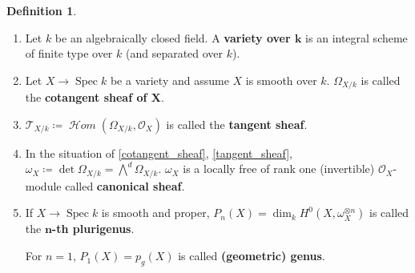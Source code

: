 \documentclass[12pt]{article}
\DeclareMathOperator{\Spec}{Spec}
\DeclareMathOperator{\shHom}{\mathcal{H}\textit{om}}
\theoremstyle{definition}
\newtheorem*{definition}{Definition}
\theoremstyle{remark}
\newtheorem*{comment}{Comment}
\begin{document}
\begin{comment}
There exists another construction of the sheaf of differentials. For that, take the diagonal $\Delta:X\rightarrow X\times_YX$ and a sheaf of ideals $\mathcal{I}_{\Delta}\subseteq\mathcal{O}_{X\times_YX}$. The sheaf of differentials is the $\mathcal{O}_X$-module $\Delta^*(\mathcal{I}/\mathcal{I}^2)$. For further details, see Hartshorne \cite{hartshorne2013algebraic}.

In analysis, if the Jacobian matrix has maximum rank, $d$ variables can be written in terms of the other variables. In algebra, this cannot be done. The solution equations don't need to be polynomials, but, at least on the complex numbers, they are power series (Hensel's lemma). The problem is that most of power series aren't algebraic over the ring of polynomials. But there exists a ring in between that extends polynomials and is algebraic.
\[
\begin{tikzcd}
R=k[x_1,\ldots,x_n]\arrow[rr,hook]\arrow[rd]&&\hat{R}=k[|x_1,\ldots,x_n|]\\
&R^h\arrow[ru]
\end{tikzcd}
\]
$R^h$ is called the ``Henselization'' of $R$.
\end{comment}

\begin{definition}
\begin{enumerate}[label=\arabic*)]
\item Let $k$ be an algebraically closed field. A \textbf{variety over $\boldsymbol{k}$} is an integral scheme of finite type over $k$ (and separated over $k$).

\item\label{cotangent_sheaf} Let $X\rightarrow\Spec k$ be a variety and assume $X$ is smooth over $k$. $\Omega_{X/k}$ is called the \textbf{cotangent sheaf of $\boldsymbol{X}$}.

\item\label{tangent_sheaf} $\mathcal{T}_{X/k}\coloneqq\shHom(\Omega_{X/k},\mathcal{O}_X)$ is called the \textbf{tangent sheaf}.

\item In the situation of \ref{cotangent_sheaf}, \ref{tangent_sheaf}, $\omega_X\coloneqq\det\Omega_{X/k}={\bigwedge}^d\Omega_{X/k}$. $\omega_X$ is a locally free of rank one (invertible) $\mathcal{O}_X$-module called \textbf{canonical sheaf}.

\item If $X\rightarrow\Spec k$ is smooth and proper, $P_n(X)=\dim_kH^0(X,\omega_X^{\otimes n})$ is called the \textbf{$\boldsymbol{n}$-th plurigenus}.

For $n=1$, $P_1(X)=p_g(X)$ is called \textbf{(geometric) genus}.
\end{enumerate}
\end{definition}
\end{document}
